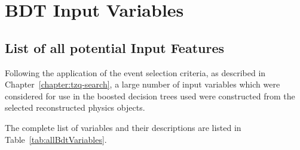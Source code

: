 \chapter{BDT Input Variables}\label{app:bdt}
\section{List of all potential Input Features}\label{appsec:bdtFeatures}
Following the application of the event selection criteria, as described in Chapter~\ref{chapter:tzq-search}, a large number of input variables which were considered for use in the boosted decision trees used were constructed from the selected reconstructed physics objects.

The complete list of variables and their descriptions are listed in Table~\ref{tab:allBdtVariables}.

